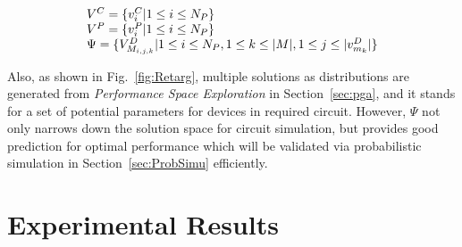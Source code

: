     \begin{align}{\label{eq:FullReTarg}}
      \begin{array}{l}
        V^C = \{v^C_i| 1 \leq i \leq N_P\}\\
        V^P = \{v^P_i| 1 \leq i \leq N_P\}\\
        \Psi =  \{V^D_{M_{i,j,k}}| 1\leq i \leq N_P, 1 \leq k \leq |M|, 1 \leq j \leq |v^D_{m_k}|\} 
      \end{array}
    \end{align}

    Also, as shown in Fig.~\ref{fig:Retarg}, multiple solutions as distributions are generated from {\it Performance Space Exploration} in Section~\ref{sec:pga}, and it stands for a set of potential parameters for devices in required circuit. However, $\Psi$ not only narrows down the solution space for circuit simulation, but provides good prediction for optimal performance which will be validated via probabilistic simulation in Section~\ref{sec:ProbSimu} efficiently. 

  

  \section{Experimental Results}\label{sec:PAGEExp}

